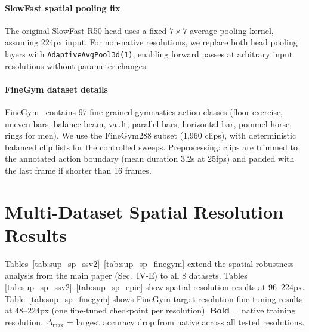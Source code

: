 \documentclass[a4paper, 10pt, conference, onecolumn]{ieeeconf}
\begin{document}
\paragraph{SlowFast spatial pooling fix}
The original SlowFast-R50 head uses a fixed $7\times7$ average pooling kernel, assuming 224px input. For non-native resolutions, we replace both head pooling layers with \texttt{AdaptiveAvgPool3d(1)}, enabling forward passes at arbitrary input resolutions without parameter changes.

\paragraph{FineGym dataset details}
FineGym~\cite{shao2020finegym} contains 97 fine-grained gymnastics action classes (floor exercise, uneven bars, balance beam, vault; parallel bars, horizontal bar, pommel horse, rings for men). We use the FineGym288 subset (1,960 clips), with deterministic balanced clip lists for the controlled sweeps. Preprocessing: clips are trimmed to the annotated action boundary (mean duration 3.2s at 25fps) and padded with the last frame if shorter than 16 frames.

\section{Multi-Dataset Spatial Resolution Results}
\label{sec:sup_spatial}

Tables~\ref{tab:sup_sp_ssv2}--\ref{tab:sup_sp_finegym} extend the spatial robustness analysis from the main paper (Sec.~IV-E) to all 8 datasets. Tables \ref{tab:sup_sp_ssv2}--\ref{tab:sup_sp_epic} show spatial-resolution results at 96--224px. Table~\ref{tab:sup_sp_finegym} shows FineGym target-resolution fine-tuning results at 48--224px (one fine-tuned checkpoint per resolution). \textbf{Bold} = native training resolution. $\Delta_\text{max}$ = largest accuracy drop from native across all tested resolutions.
\end{document}
